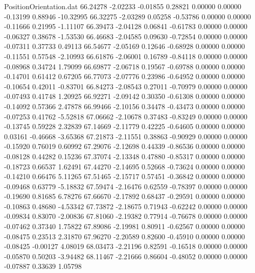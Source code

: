 \begin{filecontents}{PositionOrientation.dat}
  66.24278   -2.02233   -0.01855     0.28821    0.00000    0.00000   -0.13199    0.88946  -10.32995
  66.32275   -2.03289    0.05258    -0.53786    0.00000    0.00000   -0.11666    0.21995   -1.11107
  66.39473   -2.04128    0.06841    -0.61783    0.00000    0.00000   -0.06327    0.38678   -1.53530
  66.46683   -2.04585    0.09630    -0.72854    0.00000    0.00000   -0.07311    0.37733    0.49113
  66.54677   -2.05169    0.12646    -0.68928    0.00000    0.00000   -0.11551    0.57548   -2.10993
  66.61876   -2.06001    0.16789    -0.84118    0.00000    0.00000   -0.08968    0.34724    1.79099
  66.69877   -2.06718    0.19567    -0.69788    0.00000    0.00000   -0.14701    0.61412    0.67205
  66.77073   -2.07776    0.23986    -0.64952    0.00000    0.00000   -0.10654    0.42011   -0.83701
  66.84273   -2.08543    0.27011    -0.70979    0.00000    0.00000   -0.07493    0.41748    1.20925
  66.92271   -2.09142    0.30350    -0.61308    0.00000    0.00000   -0.14092    0.57366    2.47878
  66.99466   -2.10156    0.34478    -0.43473    0.00000    0.00000   -0.07253    0.41762   -5.52818
  67.06662   -2.10678    0.37483    -0.83249    0.00000    0.00000   -0.13745    0.59228    2.32839
  67.14669   -2.11779    0.42225    -0.64605    0.00000    0.00000    0.03161   -0.46668   -3.65368
  67.21873   -2.11551    0.38863    -0.90929    0.00000    0.00000   -0.15920    0.76019    0.60992
  67.29076   -2.12698    0.44339    -0.86536    0.00000    0.00000   -0.08128    0.44282    0.15236
  67.37074   -2.13348    0.47880    -0.85317    0.00000    0.00000   -0.18723    0.66537    1.62491
  67.44270   -2.14695    0.52668    -0.73624    0.00000    0.00000   -0.14210    0.66476    5.11265
  67.51465   -2.15717    0.57451    -0.36842    0.00000    0.00000   -0.09468    0.63779   -5.18832
  67.59474   -2.16476    0.62559    -0.78397    0.00000    0.00000   -0.19690    0.81685    6.78276
  67.66670   -2.17892    0.68437    -0.29591    0.00000    0.00000   -0.10863    0.48680   -4.53342
  67.73872   -2.18675    0.71943    -0.62242    0.00000    0.00000   -0.09834    0.83070   -2.00836
  67.81060   -2.19382    0.77914    -0.76678    0.00000    0.00000   -0.07462    0.37340    1.75822
  67.89086   -2.19981    0.80911    -0.62567    0.00000    0.00000   -0.08475    0.23513    2.31870
  67.96270   -2.20589    0.82600    -0.45910    0.00000    0.00000   -0.08425   -0.00127    4.08019
  68.03473   -2.21196    0.82591    -0.16518    0.00000    0.00000   -0.05870    0.50203   -3.94482
  68.11467   -2.21666    0.86604    -0.48052    0.00000    0.00000   -0.07887    0.33639    1.05798

\end{filecontents}
